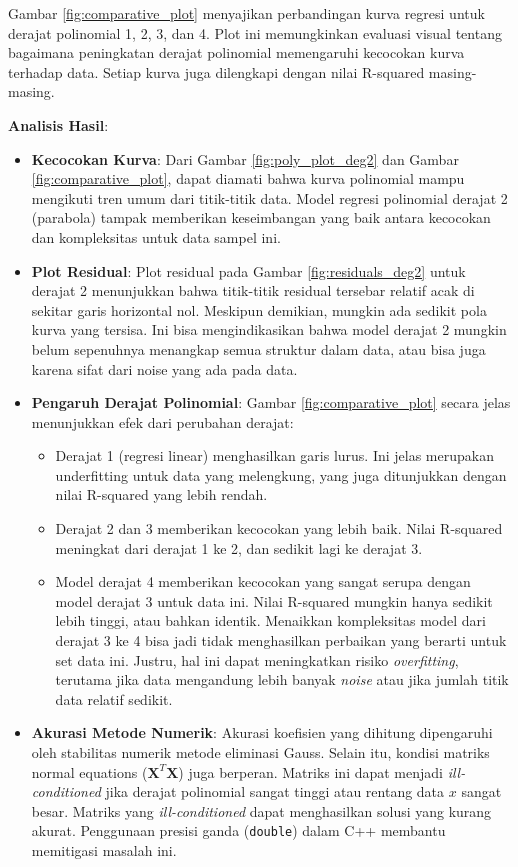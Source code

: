 \documentclass[conference]{IEEEtran}
\begin{document}
Gambar \ref{fig:comparative_plot} menyajikan perbandingan kurva regresi untuk derajat polinomial 1, 2, 3, dan 4. Plot ini memungkinkan evaluasi visual tentang bagaimana peningkatan derajat polinomial memengaruhi kecocokan kurva terhadap data. Setiap kurva juga dilengkapi dengan nilai R-squared masing-masing.

\textbf{Analisis Hasil}:
\begin{itemize}
    \item \textbf{Kecocokan Kurva}: Dari Gambar \ref{fig:poly_plot_deg2} dan Gambar \ref{fig:comparative_plot}, dapat diamati bahwa kurva polinomial mampu mengikuti tren umum dari titik-titik data. Model regresi polinomial derajat 2 (parabola) tampak memberikan keseimbangan yang baik antara kecocokan dan kompleksitas untuk data sampel ini.
    \item \textbf{Plot Residual}: Plot residual pada Gambar \ref{fig:residuals_deg2} untuk derajat 2 menunjukkan bahwa titik-titik residual tersebar relatif acak di sekitar garis horizontal nol. Meskipun demikian, mungkin ada sedikit pola kurva yang tersisa. Ini bisa mengindikasikan bahwa model derajat 2 mungkin belum sepenuhnya menangkap semua struktur dalam data, atau bisa juga karena sifat dari noise yang ada pada data.
    \item \textbf{Pengaruh Derajat Polinomial}: Gambar \ref{fig:comparative_plot} secara jelas menunjukkan efek dari perubahan derajat:
    \begin{itemize}
        \item Derajat 1 (regresi linear) menghasilkan garis lurus. Ini jelas merupakan underfitting untuk data yang melengkung, yang juga ditunjukkan dengan nilai R-squared yang lebih rendah.
        \item Derajat 2 dan 3 memberikan kecocokan yang lebih baik. Nilai R-squared meningkat dari derajat 1 ke 2, dan sedikit lagi ke derajat 3.
        \item Model derajat 4 memberikan kecocokan yang sangat serupa dengan model derajat 3 untuk data ini. Nilai R-squared mungkin hanya sedikit lebih tinggi, atau bahkan identik. Menaikkan kompleksitas model dari derajat 3 ke 4 bisa jadi tidak menghasilkan perbaikan yang berarti untuk set data ini. Justru, hal ini dapat meningkatkan risiko \textit{overfitting}, terutama jika data mengandung lebih banyak \textit{noise} atau jika jumlah titik data relatif sedikit.
    \end{itemize}
    \item \textbf{Akurasi Metode Numerik}: Akurasi koefisien yang dihitung dipengaruhi oleh stabilitas numerik metode eliminasi Gauss. Selain itu, kondisi matriks normal equations ($\mathbf{X}^T\mathbf{X}$) juga berperan. Matriks ini dapat menjadi \textit{ill-conditioned} jika derajat polinomial sangat tinggi atau rentang data $x$ sangat besar. Matriks yang \textit{ill-conditioned} dapat menghasilkan solusi yang kurang akurat. Penggunaan presisi ganda (\texttt{double}) dalam C++ membantu memitigasi masalah ini.

\end{itemize}
\end{document}
